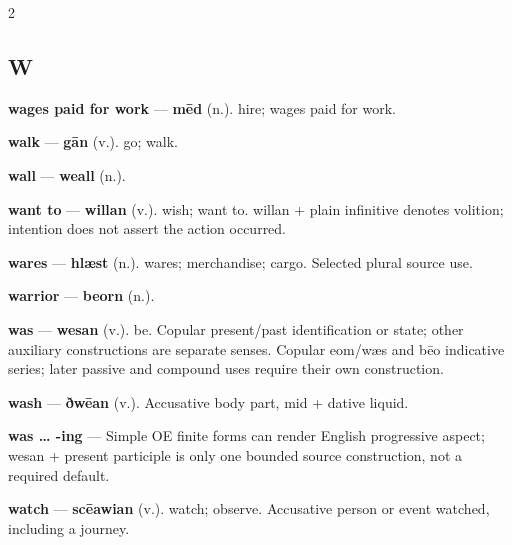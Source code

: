 \begin{multicols}{2}
\subsection*{W}
\textbf{wages paid for work} — \textbf{mēd} (n.). hire; wages paid for work.\par
\textbf{walk} — \textbf{gān} (v.). go; walk.\par
\textbf{wall} — \textbf{weall} (n.).\par
\textbf{want to} — \textbf{willan} (v.). wish; want to. willan + plain infinitive denotes volition; intention does not assert the action occurred.\par
\textbf{wares} — \textbf{hlæst} (n.). wares; merchandise; cargo. Selected plural source use.\par
\textbf{warrior} — \textbf{beorn} (n.).\par
\textbf{was} — \textbf{wesan} (v.). be. Copular present/past identification or state; other auxiliary constructions are separate senses. Copular eom/wæs and bēo indicative series; later passive and compound uses require their own construction.\par
\textbf{wash} — \textbf{ðwēan} (v.). Accusative body part, mid + dative liquid.\par
\textbf{was … -ing} — Simple OE finite forms can render English progressive aspect; wesan + present participle is only one bounded source construction, not a required default.\par
\textbf{watch} — \textbf{scēawian} (v.). watch; observe. Accusative person or event watched, including a journey.\par

\end{multicols}
